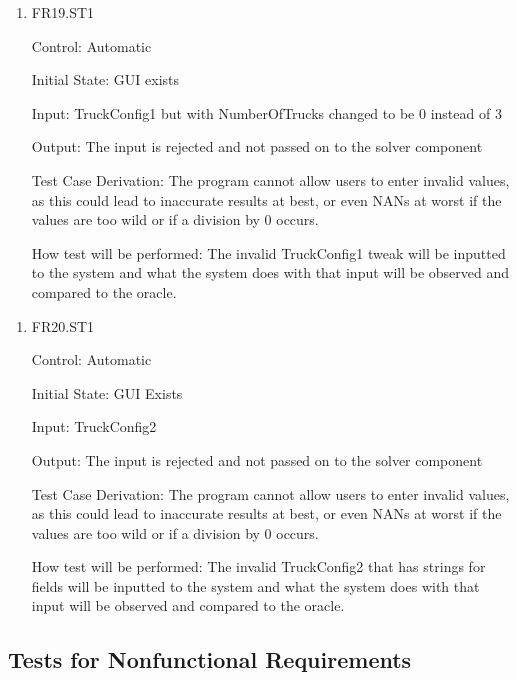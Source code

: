 \documentclass[12pt, titlepage]{article}
\begin{document}
\begin{enumerate}

  \item{FR19.ST1\\}
  
  Control: Automatic
            
  Initial State: GUI exists
            
  Input: TruckConfig1 but with NumberOfTrucks changed to be 0 instead of 3
            
  Output: The input is rejected and not passed on to the solver component

  Test Case Derivation: The program cannot allow users to enter invalid values, as this could lead to inaccurate results at best, or even NANs at worst if the values are too wild or if a division by 0 occurs.
  
  How test will be performed: The invalid TruckConfig1 tweak will be inputted to the system and what the system does with that input will be observed and compared to the oracle.
                
\end{enumerate}
\begin{enumerate}

  \item{FR20.ST1\\}
  
  Control: Automatic
            
  Initial State: GUI Exists
            
  Input: TruckConfig2
            
  Output: The input is rejected and not passed on to the solver component
  
  Test Case Derivation: The program cannot allow users to enter invalid values, as this could lead to inaccurate results at best, or even NANs at worst if the values are too wild or if a division by 0 occurs.
  
  How test will be performed: The invalid TruckConfig2 that has strings for fields will be inputted to the system and what the system does with that input will be observed and compared to the oracle.
                  
\end{enumerate}

\subsection{Tests for Nonfunctional Requirements}
\end{document}
